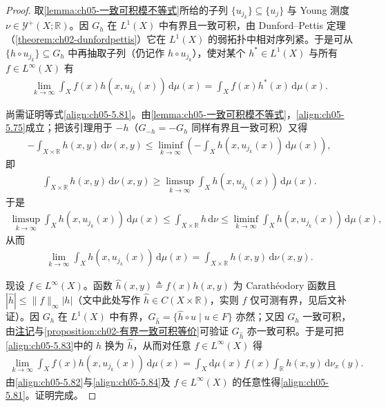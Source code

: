 \documentclass[../../main.tex]{subfiles}
\begin{document}
\begin{proof}
取\cref{lemma:ch05-一致可积模不等式}所给的子列 $\{u_{j_k}\}\subseteq\{u_j\}$ 与 Young 测度 $\nu\in\mathcal{Y}^+(X;\mathbb{R})$。因 $G_h$ 在 $L^1(X)$ 中有界且一致可积，由 Dunford--Pettis 定理（\cref{theorem:ch02-dunfordpettis}）它在 $L^1(X)$ 的弱拓扑中相对序列紧。于是可从 $\{h\circ u_{j_k}\}\subseteq G_h$ 中再抽取子列（仍记作 $h\circ u_{j_k}$），使对某个 $h^*\in L^1(X)$ 与所有 $f\in L^\infty(X)$ 有
\begin{align}
\lim_{k\to\infty}\int_Xf(x)h(x,u_{j_k}(x))\,\mathrm{d}\mu(x)
=\int_Xf(x)h^*(x)\,\mathrm{d}\mu(x).\label{align:ch05-5.82}
\end{align}

尚需证明等式\eqref{align:ch05-5.81}。由\cref{lemma:ch05-一致可积模不等式}，\eqref{align:ch05-5.75}成立；把该引理用于 $-h$（$G_{-h}=-G_h$ 同样有界且一致可积）又得
\begin{align*}
-\int_{X\times\mathbb{R}}h(x,y)\,\mathrm{d}\nu(x,y)
\leqslant\liminf_{k\to\infty}\left(-\int_Xh(x,u_{j_k}(x))\,\mathrm{d}\mu(x)\right),
\end{align*}
即
\begin{align*}
\int_{X\times\mathbb{R}}h(x,y)\,\mathrm{d}\nu(x,y)
\geqslant\limsup_{k\to\infty}\int_Xh(x,u_{j_k}(x))\,\mathrm{d}\mu(x).
\end{align*}
于是
\begin{align*}
\limsup_{k\to\infty}\int_Xh(x,u_{j_k}(x))\,\mathrm{d}\mu(x)
\leqslant\int_{X\times\mathbb{R}}h\,\mathrm{d}\nu
\leqslant\liminf_{k\to\infty}\int_Xh(x,u_{j_k}(x))\,\mathrm{d}\mu(x),
\end{align*}
从而
\begin{align}
\lim_{k\to\infty}\int_Xh(x,u_{j_k}(x))\,\mathrm{d}\mu(x)
=\int_{X\times\mathbb{R}}h(x,y)\,\mathrm{d}\nu(x,y).\label{align:ch05-5.83}
\end{align}

现设 $f\in L^\infty(X)$。函数 $\hat h(x,y)\triangleq f(x)h(x,y)$ 为 Carathéodory 函数且 $|\hat h|\leqslant\|f\|_\infty|h|$（文中此处写作 $\hat h\in C(X\times\mathbb{R})$，实则 $f$ 仅可测有界，见后文补证）。因 $G_h$ 在 $L^1(X)$ 中有界，$G_{\hat h}=\{\hat h\circ u\mid u\in F\}$ 亦然；又因 $G_h$ 一致可积，由\hyperref[remark:ch02-正负一致可积]{注记}与\cref{proposition:ch02-有界一致可积等价}可验证 $G_{\hat h}$ 亦一致可积。于是可把\eqref{align:ch05-5.83}中的 $h$ 换为 $\hat h$，从而对任意 $f\in L^\infty(X)$ 得
\begin{align}
\lim_{k\to\infty}\int_Xf(x)h(x,u_{j_k}(x))\,\mathrm{d}\mu(x)
=\int_X\mathrm{d}\mu(x)\,f(x)\int_{\mathbb{R}}h(x,y)\,\mathrm{d}\nu_x(y).\label{align:ch05-5.84}
\end{align}
由\eqref{align:ch05-5.82}与\eqref{align:ch05-5.84}及 $f\in L^\infty(X)$ 的任意性得\eqref{align:ch05-5.81}。证明完成。
\end{proof}
\end{document}
